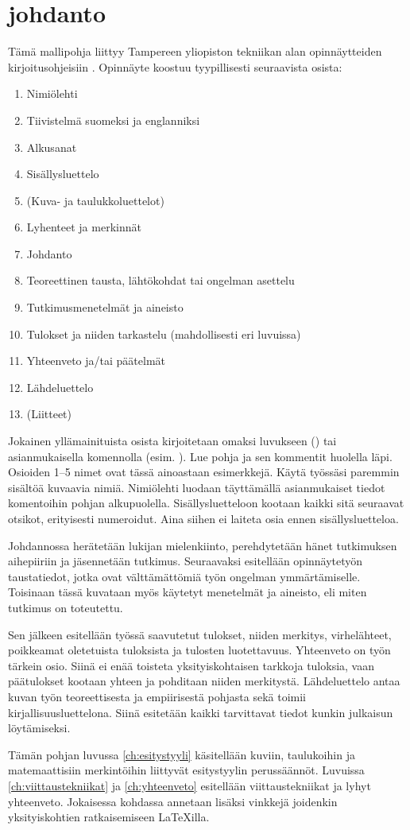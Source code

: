 \chapter{johdanto}%
\label{ch:johdanto}

Tämä mallipohja liittyy Tampereen yliopiston tekniikan alan opinnäytteiden kirjoitusohjeisiin \parencite{kirjoitusohje2018}. Opinnäyte koostuu tyypillisesti seuraavista osista:

\begin{enumerate}
    \item[] Nimiölehti
    \item[] Tiivistelmä suomeksi ja englanniksi
    \item[] Alkusanat
    \item[] Sisällysluettelo
    \item[] (Kuva- ja taulukkoluettelot)
    \item[] Lyhenteet ja merkinnät
    \item Johdanto
    \item Teoreettinen tausta, lähtökohdat tai ongelman asettelu
    \item Tutkimusmenetelmät ja aineisto
    \item Tulokset ja niiden tarkastelu (mahdollisesti eri luvuissa)
    \item Yhteenveto ja/tai päätelmät
    \item[] Lähdeluettelo
    \item[] (Liitteet)
\end{enumerate}

Jokainen yllämainituista osista kirjoitetaan omaksi luvukseen () tai asianmukaisella komennolla (esim. ). Lue pohja ja sen kommentit huolella läpi. Osioiden 1--5 nimet ovat tässä ainoastaan esimerkkejä. Käytä työssäsi paremmin sisältöä kuvaavia nimiä. Nimiölehti luodaan täyttämällä asianmukaiset tiedot komentoihin pohjan alkupuolella. Sisällysluetteloon kootaan kaikki sitä seuraavat otsikot, erityisesti numeroidut. Aina siihen ei laiteta osia ennen sisällysluetteloa.

Johdannossa herätetään lukijan mielenkiinto, perehdytetään hänet tutkimuksen aihepiiriin ja jäsennetään tutkimus. Seuraavaksi esitellään opinnäytetyön taustatiedot, jotka ovat välttämättömiä työn ongelman ymmärtämiselle. Toisinaan tässä kuvataan myös käytetyt menetelmät ja aineisto, eli miten tutkimus on toteutettu.

Sen jälkeen esitellään työssä saavutetut tulokset, niiden merkitys, virhelähteet, poikkeamat oletetuista tuloksista ja tulosten luotettavuus. Yhteenveto on työn tärkein osio. Siinä ei enää toisteta yksityiskohtaisen tarkkoja tuloksia, vaan päätulokset kootaan yhteen ja pohditaan niiden merkitystä. Lähdeluettelo antaa kuvan työn teoreettisesta ja empiirisestä pohjasta sekä toimii kirjallisuusluettelona. Siinä esitetään kaikki tarvittavat tiedot kunkin julkaisun löytämiseksi.

Tämän pohjan luvussa \ref{ch:esitystyyli} käsitellään kuviin, taulukoihin ja matemaattisiin merkintöihin liittyvät esitystyylin perussäännöt. Luvuissa \ref{ch:viittaustekniikat} ja \ref{ch:yhteenveto} esitellään viittaustekniikat ja lyhyt yhteenveto. Jokaisessa kohdassa annetaan lisäksi vinkkejä joidenkin yksityiskohtien ratkaisemiseen \LaTeX{}illa.
